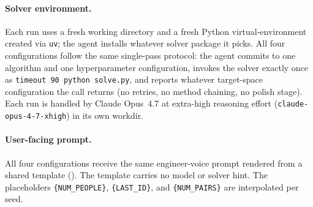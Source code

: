 \documentclass{article}
\begin{document}
\paragraph{Solver environment.}
Each run uses a fresh working directory and a fresh Python virtual-environment created via \texttt{uv}; the agent installs whatever solver package it picks. All four configurations follow the same single-pass protocol: the agent commits to one algorithm and one hyperparameter configuration, invokes the solver exactly once as \texttt{timeout 90 python solve.py}, and reports whatever target-space configuration the call returns (no retries, no method chaining, no polish stage). Each run is handled by Claude Opus~4.7 at extra-high reasoning effort (\texttt{claude-opus-4-7-xhigh}) in its own workdir.

\paragraph{User-facing prompt.}
All four configurations receive the same engineer-voice prompt rendered from a shared template (). The template carries no model or solver hint. The placeholders \texttt{\{NUM\_PEOPLE\}}, \texttt{\{LAST\_ID\}}, and \texttt{\{NUM\_PAIRS\}} are interpolated per seed.
\end{document}
